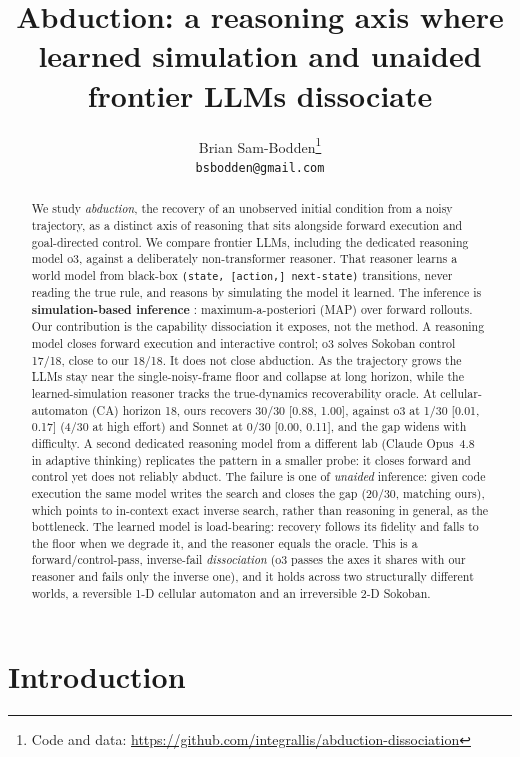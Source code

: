 \documentclass{article}
\title{Abduction: a reasoning axis where learned simulation and unaided frontier LLMs dissociate}
\author{%
  Brian Sam-Bodden\thanks{Code and data: \url{https://github.com/integrallis/abduction-dissociation}} \\
  \texttt{bsbodden@gmail.com} \\
}
\begin{document}
\maketitle

\begin{abstract}
We study \emph{abduction}, the recovery of an unobserved initial condition from a noisy
trajectory, as a distinct axis of reasoning that sits alongside forward execution and
goal-directed control. We compare frontier LLMs, including the dedicated reasoning model o3,
against a deliberately non-transformer reasoner. That reasoner learns a world model from
black-box \texttt{(state, [action,] next-state)} transitions, never reading the true rule, and
reasons by simulating the model it learned. The inference is \textbf{simulation-based inference}
\cite{sbi2020}: maximum-a-posteriori (MAP) over forward rollouts. Our contribution is the
capability dissociation it exposes, not the method. A reasoning model closes forward
execution and interactive control; o3 solves Sokoban control 17/18, close to our 18/18. It does
not close abduction. As the trajectory grows the LLMs stay near the single-noisy-frame floor and collapse at long horizon,
while the learned-simulation reasoner tracks the true-dynamics recoverability oracle. At
cellular-automaton (CA) horizon 18, ours recovers 30/30 [0.88, 1.00], against o3 at 1/30 [0.01, 0.17] (4/30 at high effort) and Sonnet at 0/30
[0.00, 0.11], and the gap widens with difficulty. A second dedicated reasoning model from a different
lab (Claude Opus~4.8 in adaptive thinking) replicates the pattern in a smaller probe: it closes
forward and control yet does not reliably abduct. The failure is one of \emph{unaided} inference:
given code execution the same model writes the search and closes the gap (20/30, matching ours), which
points to in-context exact inverse search, rather than reasoning in general, as the bottleneck.
The learned model is load-bearing: recovery
follows its fidelity and falls to the floor when we degrade it, and the reasoner equals the
oracle. This is a forward/control-pass, inverse-fail \emph{dissociation} (o3 passes the axes it
shares with our reasoner and fails only the inverse one), and it holds across two structurally
different worlds, a reversible 1-D cellular automaton and an irreversible 2-D Sokoban.
\end{abstract}

\section{Introduction}
\label{sec:intro}
\end{document}
